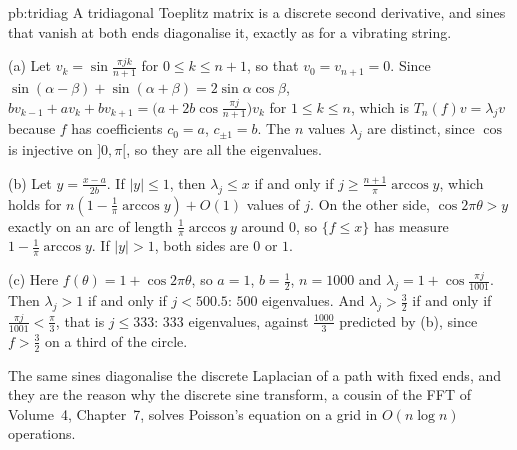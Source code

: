 \begin{solution}{pb:tridiag}
\idea A tridiagonal Toeplitz matrix is a discrete second derivative, and sines that vanish at both ends diagonalise it, exactly as for a vibrating string.

\writeup (a) Let $v_k=\sin\frac{\pi jk}{n+1}$ for $0\le k\le n+1$, so that $v_0=v_{n+1}=0$. Since $\sin(\alpha-\beta)+\sin(\alpha+\beta)=2\sin\alpha\cos\beta$,
$bv_{k-1}+av_k+bv_{k+1}=\bigl(a+2b\cos\frac{\pi j}{n+1}\bigr)v_k$ for $1\le k\le n$, which is $T_n(f)v=\lambda_jv$ because $f$ has coefficients $c_0=a$, $c_{\pm1}=b$. The $n$ values $\lambda_j$ are
distinct, since $\cos$ is injective on $]0,\pi[$, so they are all the eigenvalues.

(b) Let $y=\frac{x-a}{2b}$. If $|y|\le1$, then $\lambda_j\le x$ if and only if $j\ge\frac{n+1}\pi\arccos y$, which holds for $n(1-\frac1\pi\arccos y)+O(1)$ values of $j$. On the other side,
$\cos2\pi\theta>y$ exactly on an arc of length $\frac1\pi\arccos y$ around $0$, so $\{f\le x\}$ has measure $1-\frac1\pi\arccos y$. If $|y|>1$, both sides are $0$ or $1$.

(c) Here $f(\theta)=1+\cos2\pi\theta$, so $a=1$, $b=\frac12$, $n=1000$ and $\lambda_j=1+\cos\frac{\pi j}{1001}$. Then $\lambda_j>1$ if and only if $j<500.5$: $500$ eigenvalues. And
$\lambda_j>\frac32$ if and only if $\frac{\pi j}{1001}<\frac\pi3$, that is $j\le333$: $333$ eigenvalues, against $\frac{1000}3$ predicted by (b), since $f>\frac32$ on a third of the circle.

\leads The same sines diagonalise the discrete Laplacian of a path with fixed ends, and they are the reason why the discrete sine transform, a cousin of the FFT of Volume~4, Chapter~7, solves
Poisson's equation on a grid in $O(n\log n)$ operations.
\end{solution}

